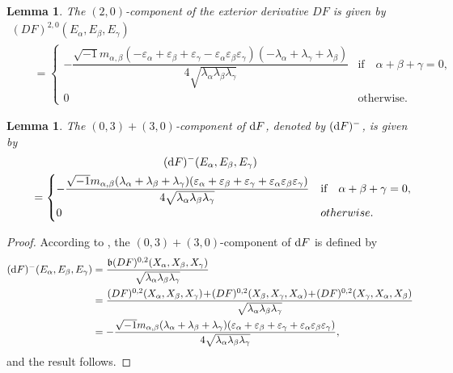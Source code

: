 \documentclass[pdftex]{sigma}%
\numberwithin{equation}{section}
\newtheorem{Lemma}[Theorem]{Lemma}
\begin{document}
\begin{Lemma}
The $(2,0)$-component of the exterior derivative $DF$ is given by
\begin{gather*}
(DF)^{2,0}(E_{\alpha},E_{\beta},E_{\gamma})
\\ \qquad
{}=
\begin{cases}
-\dfrac{\sqrt{-1} m_{\alpha,\beta}(-\varepsilon_{\alpha}+\varepsilon_{\beta}+\varepsilon_{\gamma} -\varepsilon_{\alpha}\varepsilon_{\beta}\varepsilon_{\gamma})(-\lambda_{\alpha}+\lambda_{\gamma} +\lambda_{\beta})}{4\sqrt{\lambda_{\alpha}\lambda_{\beta}\lambda_{\gamma}}} & \text{if}\quad \alpha+\beta+\gamma = 0,
\\
0& \text{otherwise.}
\end{cases}
\end{gather*}
\end{Lemma}


\begin{Lemma}
The $(0,3)+(3,0)$-component of ${\rm d}F$, denoted by $({\rm d}F)^{-}$, is given by
\begin{gather*}({\rm d}F)^{-}(E_{\alpha},E_{\beta},E_{\gamma})
\\ \qquad
{}=
\begin{cases}
-\dfrac{\sqrt{-1} m_{\alpha,\beta}(\lambda_{\alpha}+\lambda_{\beta}+\lambda_{\gamma})(\varepsilon_{\alpha} +\varepsilon_{\beta}+\varepsilon_{\gamma}+\varepsilon_{\alpha}\varepsilon_{\beta}\varepsilon_{\gamma})} {4\sqrt{\lambda_{\alpha}\lambda_{\beta}\lambda_{\gamma}}} &\text{if}\quad \alpha+\beta+\gamma = 0,
\\
0 & {otherwise.}
\end{cases}
\end{gather*}
\end{Lemma}
\begin{proof}
According to \cite{gau}, the $(0,3)+(3,0)$-component of ${\rm d}F$ is defined by
\begin{align*}
({\rm d}F)^{-}(E_{\alpha},E_{\beta},E_{\gamma})&= \dfrac{\mathfrak{b}(DF)^{0,2}(X_{\alpha},X_{\beta},X_{\gamma})} {\sqrt{\lambda_{\alpha}\lambda_{\beta}\lambda_{\gamma}}}
\\
&=\dfrac{(DF)^{0,2}(X_{\alpha},X_{\beta},X_{\gamma})\!+\!(DF)^{0,2}(X_{\beta},X_{\gamma},X_{\alpha}) \!+\!(DF)^{0,2}(X_{\gamma},X_{\alpha},X_{\beta})}{\sqrt{\lambda_{\alpha}\lambda_{\beta}\lambda_{\gamma}}}
\\
&=-\dfrac{ \sqrt{-1} m_{\alpha,\beta}(\lambda_{\alpha}+\lambda_{\beta}+\lambda_{\gamma})(\varepsilon_{\alpha} +\varepsilon_{\beta}+\varepsilon_{\gamma}+\varepsilon_{\alpha}\varepsilon_{\beta}\varepsilon_{\gamma})} {4\sqrt{\lambda_{\alpha}\lambda_{\beta}\lambda_{\gamma}}},
\end{align*}
and the result follows.
\end{proof}
\end{document}
